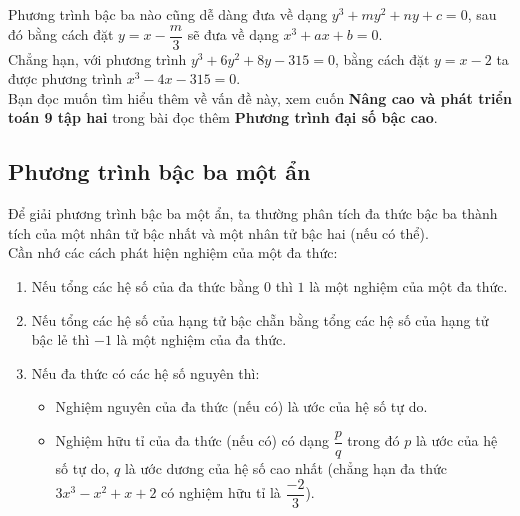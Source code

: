 \begin{note}
	Phương trình bậc ba nào cũng dễ dàng đưa về dạng $y^3 + my^2 + ny + c = 0$, sau đó bằng cách đặt $y = x - \dfrac{m}{3}$ sẽ đưa về dạng $x^3 + ax + b = 0$. \\
	\indent Chẳng hạn, với phương trình $y^3+6y^2+8y-315=0$, bằng cách đặt $y = x-2$ ta được phương trình $x^3-4x-315=0$. \\
	\indent Bạn đọc muốn tìm hiểu thêm về vấn đề này, xem cuốn \textbf{Nâng cao và phát triển toán 9 tập hai} trong bài đọc thêm \textbf{Phương trình đại số bậc cao}.
\end{note}

\subsection{Phương trình bậc ba một ẩn}
\indent Để giải phương trình bậc ba một ẩn, ta thường phân tích đa thức bậc ba thành tích của một nhân tử bậc nhất và một nhân tử bậc hai (nếu có thể). \\
\indent Cần nhớ các cách phát hiện nghiệm của một đa thức:
\begin{enumerate}[1)]
	\item Nếu tổng các hệ số của đa thức bằng $0$ thì $1$ là một nghiệm của một đa thức.
	\item Nếu tổng các hệ số của hạng tử bậc chẵn bằng tổng các hệ số của hạng tử bậc lẻ thì $-1$ là một nghiệm của đa thức.
	\item Nếu đa thức có các hệ số nguyên thì:
		\begin{itemize}
			\item Nghiệm nguyên của đa thức (nếu có) là ước của hệ số tự do.
			\item Nghiệm hữu tỉ của đa thức (nếu có) có dạng $\dfrac{p}{q}$ trong đó $p$ là ước của hệ số tự do, $q$ là ước dương của hệ số cao nhất (chẳng hạn đa thức $3x^3 - x^2 + x + 2$ có nghiệm hữu tỉ là $\dfrac{-2}{3}$).
		\end{itemize}
\end{enumerate}
